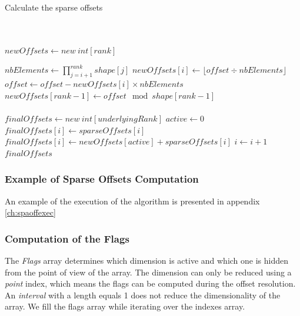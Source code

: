 \begin{algorithm}
	\caption{Calculate the sparse offsets}
	\label{alg:sparseOffsets}
\begin{algorithmic}
	\Statex
	\\
	\\
	\State $newOffsets\gets new\ int[rank]$ 
	
	\State $nbElements \gets \prod_{j=i+1}^{rank} shape[j]$
	\State $newOffsets[i] \gets \lfloor offset \div nbElements\rfloor$
	\State $offset \gets offset - newOffsets[i] \times nbElements$
	\EndFor
	\State $newOffsets[rank-1] \gets offset \mod shape[rank-1]$ 
	\\
	\\	
	\State $finalOffsets\gets new\ int[underlyingRank]$	
	\State $active\gets 0$
	 
	\State $finalOffsets[i] \gets sparseOffsets[i]$
	\Else
	\State $finalOffsets[i] \gets newOffsets[active] + sparseOffsets[i]$
	\State $i \gets i + 1$
	\EndIf
	\EndFor
	\Return $finalOffsets$
\EndProcedure
\end{algorithmic}
\end{algorithm}

\subsubsection{Example of Sparse Offsets Computation}
An example of the execution of the algorithm is presented in appendix \ref{ch:spaoffexec}

\subsubsection{Computation of the Flags}
The \textit{Flags} array determines which dimension is active and which one is hidden from the point of view of the array. The \textbf{}dimension can only be reduced using a \textit{point} index, which means the flags can be computed during the offset resolution. An \textit{interval} with a length equals 1 does not reduce the dimensionality of the array. We fill the flags array while iterating over the indexes array.

